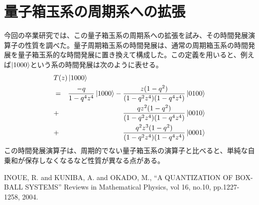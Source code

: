 \documentclass[twocolumn,10pt]{jarticle}
\begin{document}
\section{量子箱玉系の周期系への拡張}
今回の卒業研究では、この量子箱玉系の周期系への拡張を試み、その時間発展演算子の性質を調べた。量子周期箱玉系の時間発展は、通常の周期箱玉系の時間発展を量子箱玉系的な時間発展に置き換えて構成した。この定義を用いると、例えば$\ket{1000}$という系の時間発展は次のように表せる。
\begin{eqnarray*}
\lefteqn{ T(z)\ket{1000} }  \\
& = &\frac{-q}{1 - q^{4} z^{4}}\ket{1000} - \frac{z (1 - q^{2})}{(1-q^{2} z^{4})(1 - q^{4} z^{4})}\ket{0100} \\
& + & \frac{qz^2 (1 - q^{2})}{(1-q^{2} z^{4})(1 - q^{4} z^{4})}\ket{0010} \\
& + & \frac{q^2z^3 (1 - q^{2})}{(1-q^{2} z^{4})(1 - q^{4} z^{4})}\ket{0001} \\
\end{eqnarray*}
この時間発展演算子は、周期的でない量子箱玉系の演算子と比べると、単純な自乗和が保存しなくなるなど性質が異なる点がある。

\begin{thebibliography}{1}
  \bibitem{} INOUE, R. and KUNIBA, A. and OKADO, M.,
    ``A QUANTIZATION OF BOX-BALL SYSTEMS'' Reviews in Mathematical Physics,
    vol 16, no.10, pp.1227-1258, 2004.
\end{thebibliography}
\end{document}
